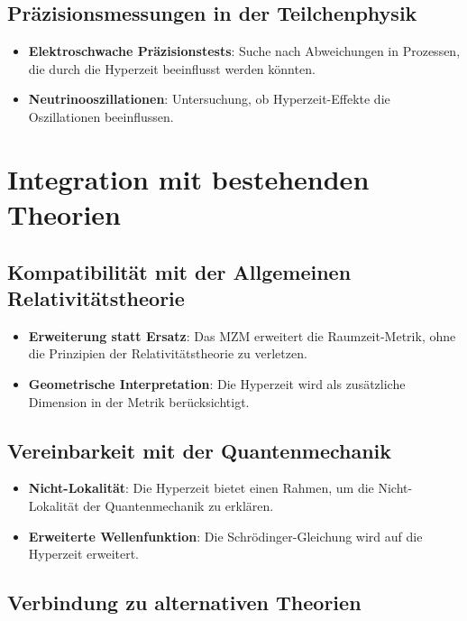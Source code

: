 \documentclass[11pt,a4paper]{article}
\begin{document}
\subsection{Präzisionsmessungen in der Teilchenphysik}

\begin{itemize}
    \item \textbf{Elektroschwache Präzisionstests}: Suche nach Abweichungen in Prozessen, die durch die Hyperzeit beeinflusst werden könnten.
    \item \textbf{Neutrinooszillationen}: Untersuchung, ob Hyperzeit-Effekte die Oszillationen beeinflussen.
\end{itemize}

\section{Integration mit bestehenden Theorien}

\subsection{Kompatibilität mit der Allgemeinen Relativitätstheorie}

\begin{itemize}
    \item \textbf{Erweiterung statt Ersatz}: Das MZM erweitert die Raumzeit-Metrik, ohne die Prinzipien der Relativitätstheorie zu verletzen.
    \item \textbf{Geometrische Interpretation}: Die Hyperzeit wird als zusätzliche Dimension in der Metrik berücksichtigt.
\end{itemize}

\subsection{Vereinbarkeit mit der Quantenmechanik}

\begin{itemize}
    \item \textbf{Nicht-Lokalität}: Die Hyperzeit bietet einen Rahmen, um die Nicht-Lokalität der Quantenmechanik zu erklären.
    \item \textbf{Erweiterte Wellenfunktion}: Die Schrödinger-Gleichung wird auf die Hyperzeit erweitert.
\end{itemize}

\subsection{Verbindung zu alternativen Theorien}
\end{document}
